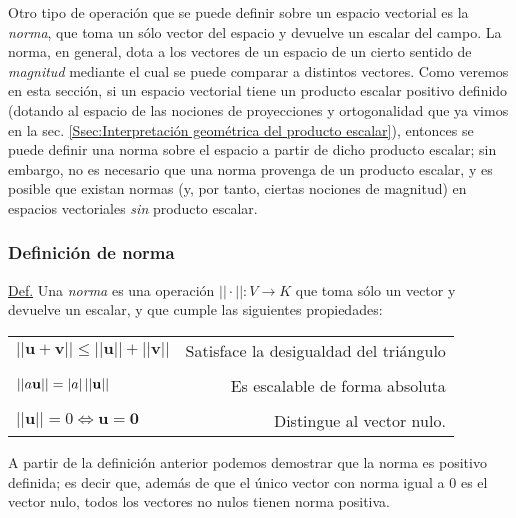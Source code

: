 \documentclass[notasLineal]{subfile}
\begin{document}
Otro tipo de operación que se puede definir sobre un espacio vectorial es la \emph{norma}, que toma un sólo vector del espacio y devuelve un escalar del campo. La norma, en general, dota a los vectores de un espacio de un cierto sentido de \emph{magnitud} mediante el cual se puede comparar a distintos vectores. Como veremos en esta sección, si un espacio vectorial tiene un producto escalar positivo definido (dotando al espacio de las nociones de proyecciones y ortogonalidad que ya vimos en la sec. \ref{Ssec:Interpretación geométrica del producto escalar}), entonces se puede definir una norma sobre el espacio a partir de dicho producto escalar; sin embargo, no es necesario que una norma provenga de un producto escalar, y es posible que existan normas (y, por tanto, ciertas nociones de magnitud) en espacios vectoriales \emph{sin} producto escalar.

\subsubsection{Definición de norma} \label{Def:Norma}

\begin{tcolorbox}
\underline{Def.} Una \textit{norma} es una operación $||\cdot||:V\rightarrow K$ que toma sólo un vector y devuelve un escalar, y que cumple las siguientes propiedades:

\begin{center}
    \begin{tabular}{lr}
        $||\mathbf{u}+\mathbf{v}|| \leq ||\mathbf{u}|| + ||\mathbf{v}||$ & Satisface la desigualdad del triángulo \\ \\
        $||a\mathbf{u}|| = |a|\hspace{0.5mm}||\mathbf{u}||$ & Es escalable de forma absoluta \\ \\
        $||\mathbf{u}||=0\iff \mathbf{u}=\mathbf{0}$ & Distingue al vector nulo.
    \end{tabular}
\end{center}

\end{tcolorbox}{}

\vspace{3mm}
\noindent A partir de la definición anterior podemos demostrar que la norma es positivo definida; es decir que, además de que el único vector con norma igual a $0$ es el vector nulo, todos los vectores no nulos tienen norma positiva.
\end{document}
